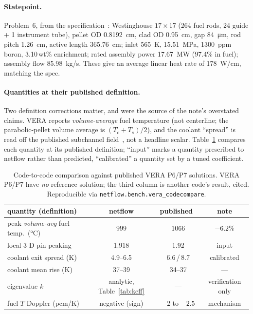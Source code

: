 \documentclass[11pt]{article}
\begin{document}
\paragraph{Statepoint.} Problem~6, from the specification~\cite{vera}:
Westinghouse $17\times17$ (264 fuel rods, 24 guide + 1 instrument tube), pellet
OD \SI{0.8192}{cm}, clad OD \SI{0.95}{cm}, gap \SI{84}{\micro m}, rod pitch
\SI{1.26}{cm}, active length \SI{365.76}{cm}; inlet \SI{565}{K},
\SI{15.51}{MPa}, \SI{1300}{ppm} boron, 3.10\,wt\% enrichment; rated assembly
power \SI{17.67}{MW} (97.4\% in fuel); assembly flow \SI{85.98}{kg/s}. These give
an average linear heat rate of \SI{178}{W/cm}, matching the spec.

\paragraph{Quantities at their published definition.} Two definition corrections
matter, and were the source of the note's overstated claims. VERA reports
\emph{volume-average} fuel temperature (not centerline; the parabolic-pellet
volume average is $(T_c+T_s)/2$), and the coolant ``spread'' is read off the
published subchannel field~\cite[Fig.~11]{kelly}, not a headline scalar.
Table~\ref{tab:val} compares each quantity at its published definition; ``input''
marks a quantity prescribed to netflow rather than predicted, ``calibrated'' a
quantity set by a tuned coefficient.

\begin{table}[t]
\centering
\caption{Code-to-code comparison against published VERA P6/P7 solutions. VERA
P6/P7 have \emph{no} reference solution; the third column is another code's
result, cited. Reproducible via \texttt{netflow.bench.vera\_codecompare}.}
\label{tab:val}
\begin{tabular}{lccc}
\toprule
quantity (definition) & netflow & published~\cite{kelly} & note \\
\midrule
peak \emph{volume-avg} fuel temp.\ (\si{\celsius}) & 999 & 1066 & $-6.2\%$ \\
local 3-D pin peaking & 1.918 & 1.92 & input \\
coolant exit spread (\si{K}) & 4.9--6.5 & 6.6\,/\,8.7 & calibrated \\
coolant mean rise (\si{K}) & 37--39 & 34--37 & --- \\
eigenvalue $k$ & analytic, Table~\ref{tab:keff} & --- & verification only \\
fuel-$T$ Doppler (pcm/K) & negative (sign) & $-2$ to $-2.5$ & mechanism \\
\bottomrule
\end{tabular}
\end{table}
\end{document}
